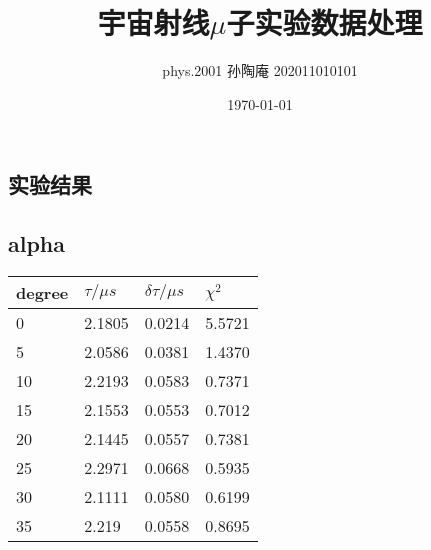 \documentclass[12pt, a4paper, oneside]{ctexart}
\title{宇宙射线$\mu$子实验数据处理}
\date{\today}
\author{phys.2001 孙陶庵 202011010101 }
\begin{document}
\begin{spacing}{2.0}
\maketitle
\section{实验结果}
\subsection{alpha}
\begin{center}
    \begin{table}[H]
        \centering
        \begin{tabular}{|l|l|l|l|} 
        \hline
        degree & $\tau /\mu s$ & $\delta \tau/\mu s$ & $\chi^2$  \\ 
        \hline
        0  & 2.1805                                        & 0.0214                                                             & 5.5721                        \\ 
        \hline
        5  & 2.0586                                        & 0.0381                                                             & 1.4370                        \\ 
        \hline
        10 & 2.2193                                        & 0.0583                                                             & 0.7371                        \\ 
        \hline
        15 & 2.1553                                        & 0.0553                                                             & 0.7012                        \\ 
        \hline
        20 & 2.1445                                        & 0.0557                                                             & 0.7381                        \\ 
        \hline
        25 & 2.2971                                        & 0.0668                                                             & 0.5935                        \\ 
        \hline
        30 & 2.1111                                        & 0.0580                                                             & 0.6199                        \\ 
        \hline
        35 & 2.219                                         & 0.0558                                                             & 0.8695                        \\ 

\end{tabular}
\end{table}
\end{center}
\end{spacing}
\end{document}
